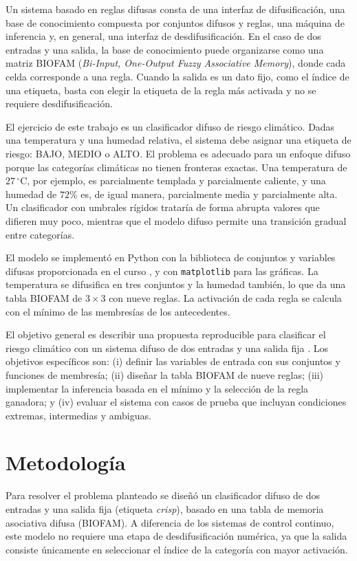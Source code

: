\documentclass[conference]{IEEEtran}
\begin{document}
Un sistema basado en reglas difusas consta de una interfaz de difusificación, una base de conocimiento compuesta por conjuntos difusos y reglas, una máquina de inferencia y, en general, una interfaz de desdifusificación. En el caso de dos entradas y una salida, la base de conocimiento puede organizarse como una matriz BIOFAM (\textit{Bi-Input, One-Output Fuzzy Associative Memory}), donde cada celda corresponde a una regla. Cuando la salida es un dato fijo, como el índice de una etiqueta, basta con elegir la etiqueta de la regla más activada y no se requiere desdifusificación.

El ejercicio de este trabajo es un clasificador difuso de riesgo climático. Dadas una temperatura y una humedad relativa, el sistema debe asignar una etiqueta de riesgo: BAJO, MEDIO o ALTO. El problema es adecuado para un enfoque difuso porque las categorías climáticas no tienen fronteras exactas. Una temperatura de \(27\,^\circ\)C, por ejemplo, es parcialmente templada y parcialmente caliente, y una humedad de \(72\%\) es, de igual manera, parcialmente media y parcialmente alta. Un clasificador con umbrales rígidos trataría de forma abrupta valores que difieren muy poco, mientras que el modelo difuso permite una transición gradual entre categorías.

El modelo se implementó en Python con la biblioteca de conjuntos y variables difusas proporcionada en el curso \cite{sanchez2026}, y con \texttt{matplotlib} para las gráficas. La temperatura se difusifica en tres conjuntos y la humedad también, lo que da una tabla BIOFAM de \(3\times3\) con nueve reglas. La activación de cada regla se calcula con el mínimo de las membresías de los antecedentes.

El objetivo general es describir una propuesta reproducible para clasificar el riesgo climático con un sistema difuso de dos entradas y una salida fija \cite{guia}. Los objetivos específicos son: (i) definir las variables de entrada con sus conjuntos y funciones de membresía; (ii) diseñar la tabla BIOFAM de nueve reglas; (iii) implementar la inferencia basada en el mínimo y la selección de la regla ganadora; y (iv) evaluar el sistema con casos de prueba que incluyan condiciones extremas, intermedias y ambiguas.

\section{Metodología}
Para resolver el problema planteado se diseñó un clasificador difuso de dos entradas y una salida fija (etiqueta \textit{crisp}), basado en una tabla de memoria asociativa difusa (BIOFAM). A diferencia de los sistemas de control continuo, este modelo no requiere una etapa de desdifusificación numérica, ya que la salida consiste únicamente en seleccionar el índice de la categoría con mayor activación.
\end{document}
